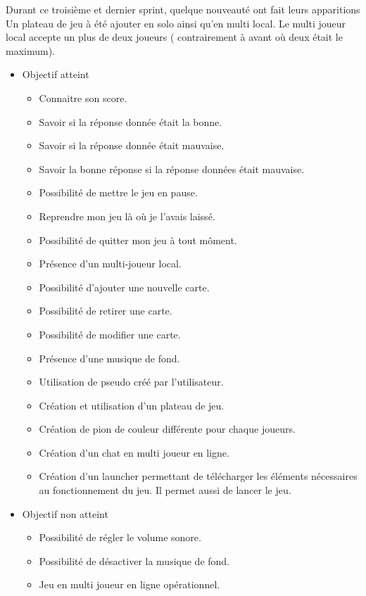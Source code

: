 Durant ce troisième et dernier sprint, quelque nouveauté ont fait leurs apparitions\\
Un plateau de jeu à été ajouter en solo ainsi qu'en multi local.
Le multi joueur local accepte un plus de deux joueurs ( contrairement à avant où deux était le maximum).

\begin{itemize}
	\item Objectif atteint
	\begin{itemize}
		\item Connaitre son score.
		\item Savoir si la réponse donnée était la bonne.
		\item Savoir si la réponse donnée était mauvaise.
		\item Savoir la bonne réponse si la réponse données était mauvaise.
		\item Possibilité de mettre le jeu en pause.
		\item Reprendre mon jeu là où je l'avais laissé.
		\item Possibilité de quitter mon jeu à tout môment.
		\item Présence d'un multi-joueur local.
		\item Possibilité d'ajouter une nouvelle carte.
		\item Possibilité de retirer une carte.
		\item Possibilité de modifier une carte.
		\item Présence d'une musique de fond.
		\item Utilisation de pseudo créé par l'utilisateur.
		\item Création et utilisation d'un plateau de jeu.
		\item Création de pion de couleur différente pour chaque joueurs.
		\item Création d'un chat en multi joueur en ligne.
		\item Création d'un launcher permettant de télécharger les éléments nécessaires au fonctionnement du jeu. Il permet aussi de lancer le jeu.
	\end{itemize}
	\item Objectif non atteint
	\begin{itemize}
		\item Possibilité de régler le volume sonore.
		\item Possibilité de désactiver la musique de fond.
		\item Jeu en multi joueur en ligne opérationnel.
	\end{itemize}
\end{itemize}